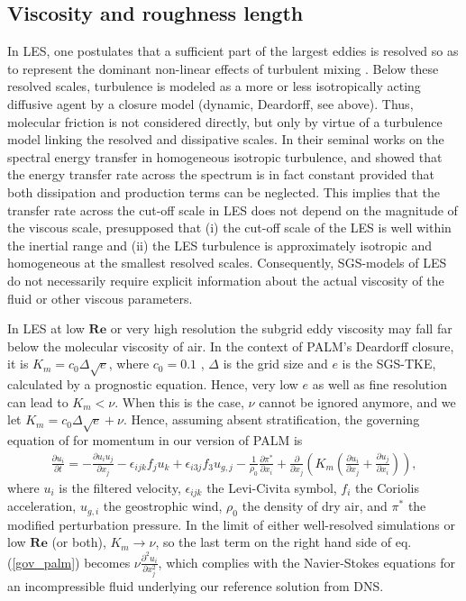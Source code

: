 \documentclass[smallcondensed,draft]{svjour3}
\newcommand{\RE}{\mathbf{Re}}
\begin{document}
\subsection{Viscosity and roughness length}

In LES, one postulates that a sufficient part of the largest eddies is resolved so as to represent the dominant non-linear effects of turbulent mixing \citep{pope2004ten}. Below these resolved scales, turbulence is modeled as a more or less isotropically acting diffusive agent by a closure model (dynamic, Deardorff, see above). Thus, molecular friction is not considered directly, but only by virtue of a turbulence model linking the resolved and dissipative scales. In their seminal works on the spectral energy transfer in homogeneous isotropic turbulence, \cite{kolmogorov1941dissipation} and \cite{obukhov1941distribution} showed that the energy transfer rate across the spectrum is in fact constant provided that both dissipation and production terms can be neglected. This implies that the transfer rate across the cut-off scale in LES does not depend on the magnitude of the viscous scale, presupposed that (i) the cut-off scale of the LES is well within the inertial range and (ii) the LES turbulence is approximately isotropic and homogeneous at the smallest resolved scales. Consequently, SGS-models of LES do not necessarily require explicit information about the actual viscosity of the fluid or other viscous parameters.

In LES at low $\RE$ or very high resolution the subgrid eddy viscosity may fall far below the molecular viscosity of air. In the context of PALM's Deardorff closure, it is $K_m = c_0 \Delta \sqrt{e}$, where $c_0 = 0.1$ \citep{deardorff1980stratocumulus}, $\Delta$ is the grid size and $e$ is the SGS-TKE, calculated by a prognostic equation. Hence, very low $e$ as well as fine resolution can lead to $K_m<\nu$. When this is the case, $\nu$ cannot be ignored anymore, and we let $K_m = c_0 \Delta \sqrt{e} + \nu$. Hence, assuming absent stratification, the governing equation of for momentum in our version of PALM is
\begin{align}\label{gov_palm}
  \frac{\partial u_i}{\partial t} = - \frac{\partial u_i u_j}{\partial x_j} -\epsilon_{ijk}f_ju_k + \epsilon_{i3j} f_3 u_{g,j} - \frac{1}{\rho_0}\frac{\partial\pi^*}{\partial x_i} + \frac{\partial}{\partial x_j}\left( K_m\left(\frac{\partial u_i}{\partial x_j} + \frac{\partial u_j}{\partial x_i} \right)\right),
\end{align}
where $u_i$ is the filtered velocity, $\epsilon_{ijk}$ the Levi-Civita symbol, $f_i$ the Coriolis acceleration, $u_{g,i}$ the geostrophic wind, $\rho_0$ the density of dry air, and $\pi^*$ the modified perturbation pressure. In the limit of either well-resolved simulations or low $\RE$ (or both), $K_m \rightarrow \nu$, so the last term on the right hand side of eq. (\ref{gov_palm}) becomes $\nu\frac{\partial^2u_i}{\partial x_j^2}$, which complies with the Navier-Stokes equations for an incompressible fluid underlying our reference solution from DNS.
\end{document}
